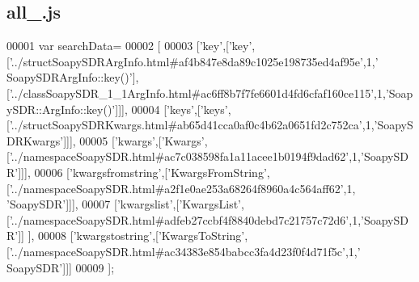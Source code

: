 \subsection{all\+\_.\+js}
\label{all__9_8js_source}

\begin{DoxyCode}
00001 var searchData=
00002 [
00003   [\textcolor{stringliteral}{'key'},[\textcolor{stringliteral}{'key'},[\textcolor{stringliteral}{'../structSoapySDRArgInfo.html#af4b847e8da89c1025e198735ed4af95e'},1,\textcolor{stringliteral}{'
      SoapySDRArgInfo::key()'}],[\textcolor{stringliteral}{'../classSoapySDR\_1\_1ArgInfo.html#ac6ff8b7f7fe6601d4fd6cfaf160ce115'},1,\textcolor{stringliteral}{'SoapySDR::ArgInfo::key()'}]]],
00004   [\textcolor{stringliteral}{'keys'},[\textcolor{stringliteral}{'keys'},[\textcolor{stringliteral}{'../structSoapySDRKwargs.html#ab65d41cca0af0c4b62a0651fd2c752ca'},1,\textcolor{stringliteral}{'SoapySDRKwargs'}]]],
00005   [\textcolor{stringliteral}{'kwargs'},[\textcolor{stringliteral}{'Kwargs'},[\textcolor{stringliteral}{'../namespaceSoapySDR.html#ac7c038598fa1a11acee1b0194f9dad62'},1,\textcolor{stringliteral}{'SoapySDR'}]]],
00006   [\textcolor{stringliteral}{'kwargsfromstring'},[\textcolor{stringliteral}{'KwargsFromString'},[\textcolor{stringliteral}{'../namespaceSoapySDR.html#a2f1e0ae253a68264f8960a4c564aff62'},1,\textcolor{stringliteral}{
      'SoapySDR'}]]],
00007   [\textcolor{stringliteral}{'kwargslist'},[\textcolor{stringliteral}{'KwargsList'},[\textcolor{stringliteral}{'../namespaceSoapySDR.html#adfeb27ccbf4f8840debd7c21757c72d6'},1,\textcolor{stringliteral}{'SoapySDR'}]]
      ],
00008   [\textcolor{stringliteral}{'kwargstostring'},[\textcolor{stringliteral}{'KwargsToString'},[\textcolor{stringliteral}{'../namespaceSoapySDR.html#ac34383e854babcc3fa4d23f0f4d71f5c'},1,\textcolor{stringliteral}{'
      SoapySDR'}]]]
00009 ];
\end{DoxyCode}

